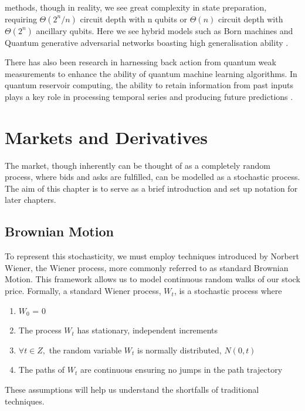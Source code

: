 \documentclass[12pt]{article}
\newcommand{\newp}
    {
    \vskip 0.5cm 
  }
\numberwithin{equation}{section}
\begin{document}
methods, though in reality, we see great complexity in state preparation, requiring 
$\Theta(2^n/n)$ circuit depth with n qubits or $\Theta(n)$ circuit depth with 
$\Theta(2^n)$ ancillary qubits\autocite{zhang_quantum_2022}. Here we see hybrid 
models such as Born machines
and Quantum generative adversarial networks boasting high generalisation ability
\autocite{ganguly_implementing_nodate,gili_2022_do,horowitz_quantum_2022}.
\newp
There has also been research in harnessing back action from quantum weak 
measurements to enhance the ability of quantum machine learning algorithms. 
In quantum reservoir computing,
the ability to retain information from past inputs plays a key role in processing 
temporal series and producing future predictions
\autocite{franceschetto_harnessing_2024,fujii_quantum_2020,garcia-beni_squeezing_2024,mujal_time-series_2023}.
\newpage
\section{Markets and Derivatives}
The market, though inherently can be thought of as a completely random process,
where bids and asks are fulfilled, can be modelled as a stochastic process. The 
aim of this chapter is to serve as a brief introduction and set up notation for 
later chapters. 

\subsection{Brownian Motion}
To represent this stochasticity, we must employ techniques introduced by Norbert 
Wiener, the Wiener process, more commonly referred to as standard Brownian Motion. 
This framework allows us to model continuous random 
walks of our stock price\autocite{brownianmotion}.
Formally, a standard Wiener process, $W_t$, is a stochastic 
process where 
\begin{enumerate}
  \item $W_0$ = 0
  \item The process $W_t$ has stationary, independent increments
  \item $\forall t \in Z,$ the random variable $W_t$ is normally distributed, $N(0,t)$ 
  \item The paths of $W_t$ are continuous ensuring no jumps in the path trajectory
\end{enumerate}
These assumptions will help us understand the shortfalls of traditional techniques.
\end{document}
